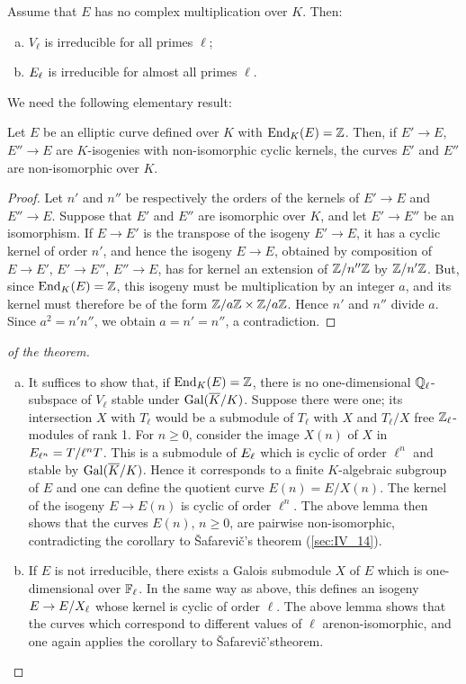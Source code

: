 \begin{thm}
Assume that $E$ has no complex multiplication over $K$.
\dpage
Then:
\begin{enumerate}[(a)]
\item\label{thm:IV_21_a} $V_\ell$ is irreducible for all primes $\ell$;
\item ${E}_{\ell}$ is irreducible for almost all primes $\ell$.
\end{enumerate}
\end{thm}

We need the following elementary result:
\begin{lem}
Let $E$ be an elliptic curve defined over $K$ with $\operatorname{End}_K(E) = \mathbb{Z}$. Then, if
$E' \to E$, $E'' \to E$ are $K$-isogenies with non-isomorphic cyclic kernels,
the curves $E'$ and $E''$ are non-isomorphic over $K$.
\end{lem}
\begin{proof}
Let $n'$ and $n''$ be respectively the orders of the kernels of
$E' \to E$ and $E'' \to E$. Suppose that $E'$ and $E''$ are isomorphic
over $K$, and let $E' \to E''$ be an isomorphism. If $E \to E'$ is the
transpose of the isogeny $E' \to E$, it has a cyclic kernel of order
$n'$, and hence the isogeny $E \to E$, obtained by composition of
$E \to E'$, $E' \to E''$, $E'' \to E$, has for kernel an extension of
$\mathbb{Z}/n''\mathbb{Z}$ by $\mathbb{Z}/n'\mathbb{Z}$. But, since $\operatorname{End}_K(E) = \mathbb{Z}$, this isogeny must be
multiplication by an integer $a$, and its kernel must therefore be of
the form $\mathbb{Z}/a\mathbb{Z} \times \mathbb{Z}/a\mathbb{Z}$. Hence $n'$ and $n''$ divide $a$. Since
$a^2 = n'n''$, we obtain $a = n' = n''$, a contradiction.
\end{proof}

\begin{proof}[ of the theorem]
\begin{enumerate}[(a), wide]
\item It suffices to show that, if $\operatorname{End}_K(E) = \mathbb{Z}$, there is no
	one-dimensional $\mathbb{Q}_\ell$-subspace of $V_\ell$ stable under
	$\operatorname{Gal}(\overline{K}/K)$. Suppose there were one; its intersection $X$ with
	$T_\ell$ would be a submodule of $T_\ell$ with $X$ and $T_\ell/X$ free
	$\mathbb{Z}_\ell$-modules of rank 1. For $n \ge 0$, consider the image $X(n)$ of
	$X$ in ${E}_{\ell^n} = T/\ell^n T$. This is a submodule of
	${E}_{\ell}$ which is cyclic of order $\ell^n$ and stable by
	$\operatorname{Gal}(\overline{K}/K)$.  Hence it corresponds to a finite $K$-algebraic
	\dpage
	subgroup of $E$ and one can define the quotient curve $E(n) = E/X(n)$.
	The kernel of the isogeny $E \to E(n)$ is cyclic of order $\ell^n$. The
	above lemma then shows that the curves $E(n)$, $n \ge 0$, are pairwise
	non-isomorphic, contradicting the corollary to \v Safarevi\v c's
	theorem (\ref{sec:IV_14}).
\item If $E$ is not irreducible, there exists a Galois submodule $X$ of $E$
	which is one-dimensional over $\mathbb{F}_\ell$. In the same way as above, this
	defines an isogeny $E \to E/{X}_{\ell}$ whose kernel is cyclic of
	order $\ell$. The above lemma shows that the curves which correspond to
	different values of $\ell$ are\break non-isomorphic, and one again
	applies the corollary to \v Safarevi\v c's\break theorem.
	\qedhere
\end{enumerate}
\end{proof}

